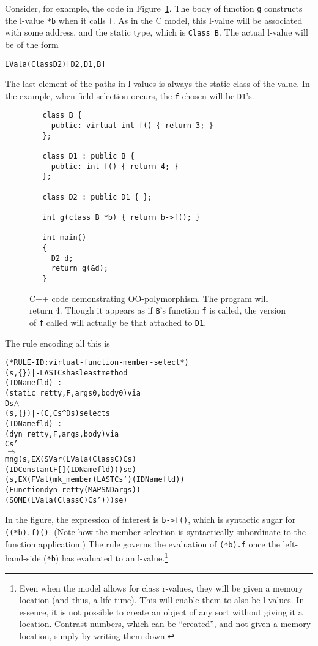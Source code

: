 \documentclass[11pt]{article}
\newcommand{\lbr}{\texttt{\{}}
\newcommand{\rbr}{\texttt{\}}}
\begin{document}
Consider, for example, the code in Figure~\ref{fig:oo-example}.  The
body of function \texttt{g} constructs the l-value \texttt{*b} when it
calls \texttt{f}.  As in the C model, this l-value will be associated
with some address, and the static type, which is \texttt{Class~B}.
The actual l-value will be of the form 
\begin{alltt}
   LVal a (Class D2) [D2,D1,B]
\end{alltt}
The last element of the paths in l-values is always the static class
of the value.  In the example, when field selection occurs, the
\texttt{f} chosen will be \texttt{D1}'s.

\begin{figure}[hbtp]
\begin{verbatim}
   class B {
     public: virtual int f() { return 3; }
   };

   class D1 : public B {
     public: int f() { return 4; }
   };

   class D2 : public D1 { };

   int g(class B *b) { return b->f(); }

   int main()
   {
     D2 d;
     return g(&d);
   }
\end{verbatim}
\caption{C++ code demonstrating OO-polymorphism.  The program will
  return 4. Though it appears as if \texttt{B}'s function \texttt{f}
  is called, the version of \texttt{f} called will actually be that
  attached to \texttt{D1}.}
\label{fig:oo-example}
\end{figure}

The rule encoding all this is 
\begin{alltt}
(* RULE-ID: virtual-function-member-select *)
     (s,\lbr\rbr) |- LAST Cs has least method
                 (IDName fld) -: 
                 (static_retty,F,args0,body0) via 
                 Ds \(\land\)
     (s,\lbr\rbr) |- (C,Cs ^ Ds) selects 
                 (IDName fld) -: 
                 (dyn_retty,F,args,body) via 
                 Cs'
   \(\Rightarrow\)
     mng (s, EX (SVar (LVal a (Class C) Cs)
                      (IDConstant F [] (IDName fld))) se) 
         (s, EX (FVal (mk_member (LAST Cs') (IDName fld))
                      (Function dyn_retty (MAP SND args))
                      (SOME (LVal a (Class C) Cs'))) se)

\end{alltt}

In the figure, the expression of interest is \texttt{b->f()}, which is
syntactic sugar for \texttt{((*b).f)()}.  (Note how the member
selection is syntactically subordinate to the function application.)
The  rule governs the evaluation of
\texttt{(*b).f} once the left-hand-side (\texttt{*b}) has evaluated to
an l-value.\footnote{Even when the model allows for class r-values,
  they will be given a memory location (and thus, a life-time).  This
  will enable them to also be l-values.  In essence, it is not
  possible to create an object of any sort without giving it a
  location.  Contrast numbers, which can be ``created'', and not given
  a memory location, simply by writing them down.}
\end{document}
